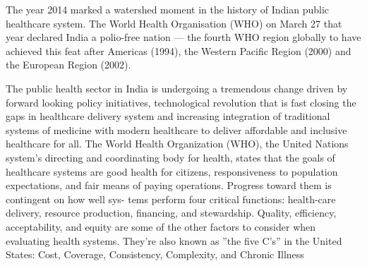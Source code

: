 \documentclass{article}
\begin{document}
The year 2014 marked a watershed moment in the history of Indian public
healthcare system. The World Health Organisation (WHO) on March 27 that
year declared India a polio-free nation — the fourth WHO region globally to
have achieved this feat after Americas (1994), the Western Pacific Region (2000)
and the European Region (2002).

The public health sector in India is undergoing a tremendous change driven
by forward looking policy initiatives, technological revolution that is fast closing
the gaps in healthcare delivery system and increasing integration of traditional
systems of medicine with modern healthcare to deliver affordable and inclusive
healthcare for all.
The World Health Organization (WHO), the United Nations system’s directing
and coordinating body for health, states that the goals of healthcare systems
are good health for citizens, responsiveness to population expectations, and fair
means of paying operations. Progress toward them is contingent on how well sys-
tems perform four critical functions: health-care delivery, resource production,
financing, and stewardship. Quality, efficiency, acceptability, and equity are
some of the other factors to consider when evaluating health systems. They’re
also known as ”the five C’s” in the United States: Cost, Coverage, Consistency,
Complexity, and Chronic Illness



%
%
\end{document}
